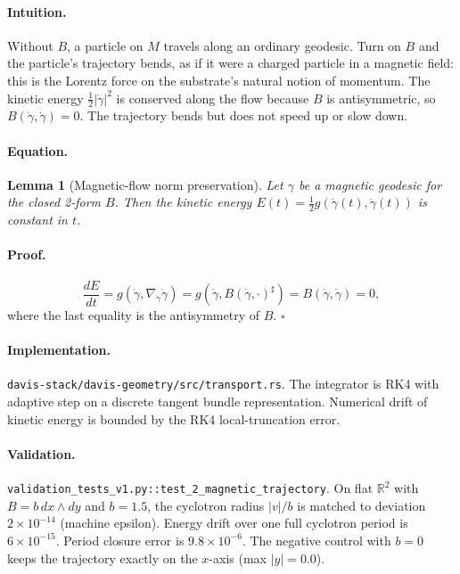 \documentclass[11pt,letterpaper]{article}
\newtheorem{lemma}[theorem]{Lemma}
\begin{document}
\paragraph{Intuition.}
Without $B$, a particle on $M$ travels along an ordinary geodesic.
Turn on $B$ and the particle's trajectory bends, as if it were a
charged particle in a magnetic field: this is the Lorentz force on
the substrate's natural notion of momentum. The kinetic energy
$\tfrac{1}{2} |\dot\gamma|^2$ is conserved along the flow because
$B$ is antisymmetric, so $B(\dot\gamma, \dot\gamma) = 0$. The
trajectory bends but does not speed up or slow down.

\paragraph{Equation.}
\begin{lemma}[Magnetic-flow norm preservation]
\label{lem:norm-preservation}
Let $\gamma$ be a magnetic geodesic for the closed 2-form $B$. Then
the kinetic energy $E(t) = \tfrac{1}{2} g(\dot\gamma(t),
\dot\gamma(t))$ is constant in $t$.
\end{lemma}

\paragraph{Proof.}
\[
\frac{dE}{dt}
= g(\dot\gamma, \nabla_{\dot\gamma} \dot\gamma)
= g(\dot\gamma, B(\dot\gamma, \cdot)^\sharp)
= B(\dot\gamma, \dot\gamma)
= 0,
\]
where the last equality is the antisymmetry of $B$. \hfill$\square$

\paragraph{Implementation.}
\texttt{davis-stack/davis-geometry/src/transport.rs}. The
integrator is RK4 with adaptive step on a discrete tangent bundle
representation. Numerical drift of kinetic energy is bounded by the
RK4 local-truncation error.

\paragraph{Validation.}
\texttt{validation\_tests\_v1.py::test\_2\_magnetic\_trajectory}.
On flat $\mathbb{R}^2$ with $B = b \, dx \wedge dy$ and $b = 1.5$, the
cyclotron radius $|v|/b$ is matched to deviation $2 \times 10^{-14}$
(machine epsilon). Energy drift over one full cyclotron period is
$6 \times 10^{-15}$. Period closure error is $9.8 \times 10^{-6}$.
The negative control with $b = 0$ keeps the trajectory exactly on
the $x$-axis (max $|y| = 0.0$).
\end{document}
